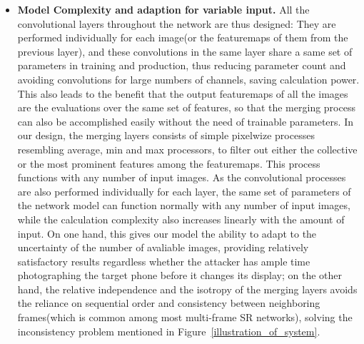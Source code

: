 \begin{itemize}[leftmargin=*]
  \item \textbf{Model Complexity and adaption for variable input.} All the convolutional layers throughout the network are thus designed: They are performed individually for each image(or the featuremaps of them from the previous layer), and these convolutions in the same layer share a same set of parameters in training and production, thus reducing parameter count and avoiding convolutions for large numbers of channels, saving calculation power. This also leads to the benefit that the output featuremaps of all the images are the evaluations over the same set of features, so that the merging process can also be accomplished easily without the need of trainable parameters. In our design, the merging layers consists of simple pixelwize processes resembling average, min and max processors, to filter out either the collective or the most prominent features among the featuremaps. This process functions with any number of input images. As the convolutional processes are also performed individually for each layer, the same set of parameters of the network model can function normally with any number of input images, while the calculation complexity also increases linearly with the amount of input. On one hand, this gives our model the ability to adapt to the uncertainty of the number of avaliable images, providing relatively satisfactory results regardless whether the attacker has ample time photographing the target phone before it changes its display; on the other hand, the relative independence and the isotropy of the merging layers avoids the reliance on sequential order and consistency between neighboring frames(which is common among most multi-frame SR networks), solving the inconsistency problem mentioned in Figure~\ref{illustration_of_system}.

\end{itemize}
